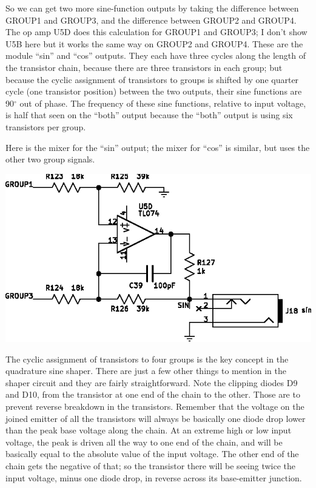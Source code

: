 So we can get two more sine-function outputs by taking the difference
between GROUP1 and GROUP3, and the difference between GROUP2 and GROUP4. 
The op amp U5D does this calculation for GROUP1 and GROUP3; I don't show U5B
here but it works the same way on GROUP2 and GROUP4.  These are the module
``sin'' and ``cos'' outputs.  They each have three cycles along the length
of the transistor chain, because there are three transistors in each group;
but because the cyclic assignment of transistors to groups is shifted by one
quarter cycle (one transistor position) between the two outputs, their sine
functions are 90$^\circ$ out of phase.  The frequency of these sine
functions, relative to input voltage, is half that seen on the ``both''
output because the ``both'' output is using six transistors per group.

\pagebreak

Here is the mixer for the ``sin'' output; the mixer for ``cos'' is similar,
but uses the other two group signals.

\noindent\includegraphics[width=\linewidth]{sh-outmix-sin}

The cyclic assignment of transistors to four groups is the key concept in
the quadrature sine shaper.  There are just a few other things to mention in
the shaper circuit and they are fairly straightforward.  Note the clipping
diodes D9 and D10, from the transistor at one end of the chain to the other. 
Those are to prevent reverse breakdown in the transistors.  Remember that
the voltage on the joined emitter of all the transistors will always be
basically one diode drop lower than the peak base voltage along the chain. 
At an extreme high or low input voltage, the peak is driven all the way to
one end of the chain, and will be basically equal to the absolute value of
the input voltage.  The other end of the chain gets the negative of that; so
the transistor there will be seeing twice the input voltage, minus one diode
drop, in reverse across its base-emitter junction.

